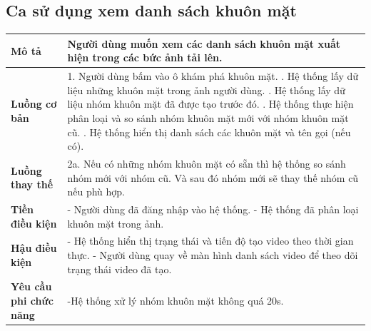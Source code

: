 \subsection{Ca sử dụng xem danh sách khuôn mặt}

\vspace{0.5cm}

\noindent 
\begin{tabularx}{\linewidth}{| l | X |} 
\hline 
\textbf{Mô tả} & Người dùng muốn xem các danh sách khuôn mặt xuất hiện trong các bức ảnh tải lên. \\
\hline 
\textbf{Luồng cơ bản} & 1. Người dùng bấm vào ô khám phá khuôn mặt. \newline
                       2. Hệ thống lấy dữ liệu những khuôn mặt trong ảnh người dùng. \newline
                       3. Hệ thống lấy dữ liệu nhóm khuôn mặt đã được tạo trước đó. \newline
                       4. Hệ thống thực hiện phân loại và so sánh nhóm khuôn mặt mới với nhóm khuôn mặt cũ. \newline
                       5. Hệ thống hiển thị danh sách các khuôn mặt và tên gọi (nếu có). \\
\hline
\textbf{Luồng thay thế} & 2a. Nếu có những nhóm khuôn mặt có sẵn thì hệ thống so sánh nhóm mới với nhóm cũ. Và sau đó nhóm mới sẽ thay thế nhóm cũ nếu phù hợp. \\
\hline
\textbf{Tiền điều kiện} & - Người dùng đã đăng nhập vào hệ thống. \newline
                           - Hệ thống đã phân loại khuôn mặt trong ảnh. \\
\textbf{Hậu điều kiện} & - Hệ thống hiển thị trạng thái và tiến độ tạo video theo thời gian thực. \newline
                         - Người dùng quay về màn hình danh sách video để theo dõi trạng thái video đã tạo. \\
\hline 
\textbf{Yêu cầu phi chức năng} & -Hệ thống xử lý nhóm khuôn mặt không quá 20s. \\
\hline 
\end{tabularx}

\vspace{0.8cm}

